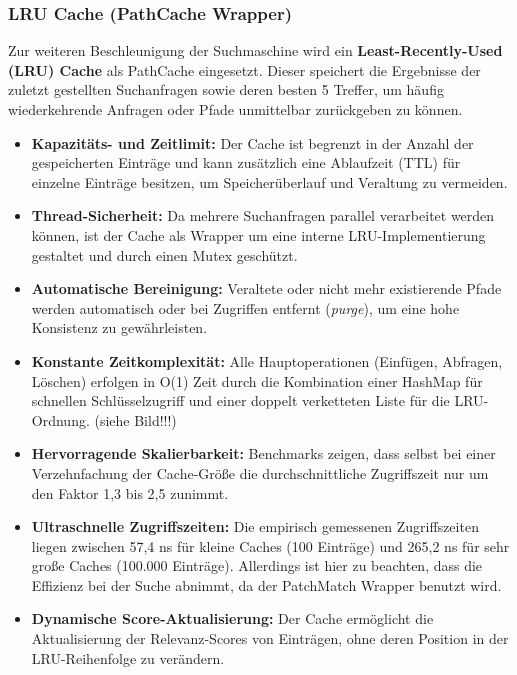 \subsubsection{LRU Cache (PathCache Wrapper)} Zur weiteren Beschleunigung der Suchmaschine wird ein \textbf{Least-Recently-Used
(LRU) Cache} als PathCache eingesetzt. Dieser speichert die Ergebnisse der zuletzt gestellten Suchanfragen sowie deren besten 5
Treffer, um häufig wiederkehrende Anfragen oder Pfade unmittelbar zurückgeben zu können.

\begin{itemize}
  \item \textbf{Kapazitäts- und Zeitlimit:} Der Cache ist begrenzt in der Anzahl der gespeicherten Einträge und kann zusätzlich
    eine Ablaufzeit (TTL) für einzelne Einträge besitzen, um Speicherüberlauf und Veraltung zu vermeiden.

  \item \textbf{Thread-Sicherheit:} Da mehrere Suchanfragen parallel verarbeitet werden können, ist der Cache als Wrapper um eine
    interne LRU-Implementierung gestaltet und durch einen Mutex geschützt.

  \item \textbf{Automatische Bereinigung:} Veraltete oder nicht mehr existierende Pfade werden automatisch oder bei Zugriffen
    entfernt (\textit{purge}), um eine hohe Konsistenz zu gewährleisten.

  \item \textbf{Konstante Zeitkomplexität:} Alle Hauptoperationen (Einfügen, Abfragen, Löschen) erfolgen in O(1) Zeit durch die
    Kombination einer HashMap für schnellen Schlüsselzugriff und einer doppelt verketteten Liste für die LRU-Ordnung. (siehe
    Bild!!!)

  \item \textbf{Hervorragende Skalierbarkeit:} Benchmarks zeigen, dass selbst bei einer Verzehnfachung der Cache-Größe die
    durchschnittliche Zugriffszeit nur um den Faktor 1,3 bis 2,5 zunimmt.

  \item \textbf{Ultraschnelle Zugriffszeiten:} Die empirisch gemessenen Zugriffszeiten liegen zwischen 57,4 ns für kleine Caches
    (100 Einträge) und 265,2 ns für sehr große Caches (100.000 Einträge). Allerdings ist hier zu beachten, dass die Effizienz bei
    der Suche abnimmt, da der PatchMatch Wrapper benutzt wird.

  \item \textbf{Dynamische Score-Aktualisierung:} Der Cache ermöglicht die Aktualisierung der Relevanz-Scores von Einträgen, ohne
    deren Position in der LRU-Reihenfolge zu verändern.
\end{itemize}

